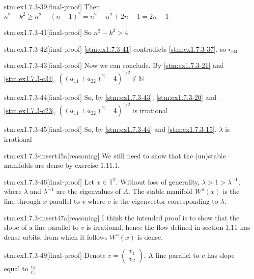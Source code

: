\begin{stm}{stm:ex1.7.3-39}[final-proof]
Then $n^2 - k^2 \ge n^2 - (n - 1)^2 = n^2 - n^2 + 2n - 1 = 2n - 1$
\end{stm}

\begin{stm}{stm:ex1.7.3-41}[final-proof]
So $n^2 - k^2 > 4$
\end{stm}

\begin{stm}{stm:ex1.7.3-42}[final-proof]
\ref{stm:ex1.7.3-41} contradicts \ref{stm:ex1.7.3-37}, so $\square_{c34}$
\end{stm}

\begin{stm}{stm:ex1.7.3-43}[final-proof]
Now we can conclude. By \ref{stm:ex1.7.3-21} and \ref{stm:ex1.7.3-c34}, $((a_{11} + a_{22})^2 - 4)^{1/2} \notin \mathbb{N}$
\end{stm}

\begin{stm}{stm:ex1.7.3-44}[final-proof]
So, by \ref{stm:ex1.7.3-43}, \ref{stm:ex1.7.3-20} and \ref{stm:ex1.7.3-c23}, $((a_{11} + a_{22})^2 - 4)^{1/2}$ is irrational
\end{stm}

\begin{stm}{stm:ex1.7.3-45}[final-proof]
So, by \ref{stm:ex1.7.3-44} and \ref{stm:ex1.7.3-15}, $\lambda$ is irrational
\end{stm}

\begin{stm}{stm:ex1.7.3-insert45a}[reasoning]
We still need to show that the (un)stable manifolds are dense by exercise 1.11.1.
\end{stm}

\begin{stm}{stm:ex1.7.3-46}[final-proof]
Let $x \in \mathbb{T}^2$. Without loss of generality, $\lambda > 1 > \lambda^{-1}$, where $\lambda$ and $\lambda^{-1}$ are the eigenvalues of $A$. The stable manifold $W^u(x)$ is the line through $x$ parallel to $v$ where $v$ is the eigenvector corresponding to $\lambda$.
\end{stm}

\begin{stm}{stm:ex1.7.3-insert47a}[reasoning]
I think the intended proof is to show that the slope of a line parallel to $v$ is irrational, hence the flow defined in section 1.11 has dense orbits, from which it follows $W^u(x)$ is dense.
\end{stm}

\begin{stm}{stm:ex1.7.3-49}[final-proof]
Denote $v = \begin{pmatrix} v_1 \\ v_2 \end{pmatrix}$. A line parallel to $v$ has slope equal to $\frac{v_2}{v_1}$
\end{stm}

